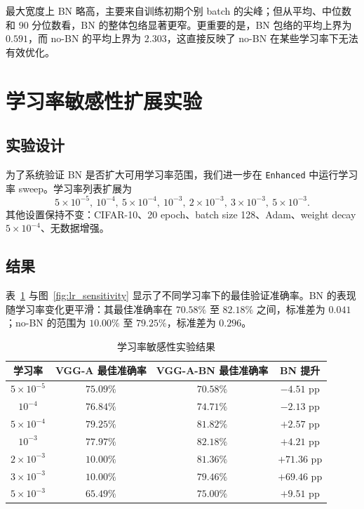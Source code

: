 \documentclass[UTF8,a4paper,11pt]{ctexart}
\begin{document}
最大宽度上 BN 略高，主要来自训练初期个别 batch 的尖峰；但从平均、中位数和 90 分位数看，BN 的整体包络显著更窄。更重要的是，BN 包络的平均上界为 $0.591$，而 no-BN 的平均上界为 $2.303$，这直接反映了 no-BN 在某些学习率下无法有效优化。

\section{学习率敏感性扩展实验}

\subsection{实验设计}

为了系统验证 BN 是否扩大可用学习率范围，我们进一步在 \texttt{Enhanced} 中运行学习率 sweep。学习率列表扩展为
\[
5\times10^{-5},\ 10^{-4},\ 5\times10^{-4},\ 10^{-3},\ 2\times10^{-3},\ 3\times10^{-3},\ 5\times10^{-3}.
\]
其他设置保持不变：CIFAR-10、20 epoch、batch size 128、Adam、weight decay $5\times10^{-4}$、无数据增强。

\subsection{结果}

表~\ref{tab:lr_sweep} 与图~\ref{fig:lr_sensitivity} 显示了不同学习率下的最佳验证准确率。BN 的表现随学习率变化更平滑：其最佳准确率在 $70.58\%$ 至 $82.18\%$ 之间，标准差为 $0.041$；no-BN 的范围为 $10.00\%$ 至 $79.25\%$，标准差为 $0.296$。

\begin{table}[H]
  \centering
  \caption{学习率敏感性实验结果}
  \label{tab:lr_sweep}
  \begin{tabular}{cccc}
    \toprule
    学习率 & VGG-A 最佳准确率 & VGG-A-BN 最佳准确率 & BN 提升 \\
    \midrule
    $5\times10^{-5}$ & $75.09\%$ & $70.58\%$ & $-4.51$ pp \\
    $10^{-4}$ & $76.84\%$ & $74.71\%$ & $-2.13$ pp \\
    $5\times10^{-4}$ & $79.25\%$ & $81.82\%$ & $+2.57$ pp \\
    $10^{-3}$ & $77.97\%$ & $\mathbf{82.18\%}$ & $+4.21$ pp \\
    $2\times10^{-3}$ & $10.00\%$ & $81.36\%$ & $+71.36$ pp \\
    $3\times10^{-3}$ & $10.00\%$ & $79.46\%$ & $+69.46$ pp \\
    $5\times10^{-3}$ & $65.49\%$ & $75.00\%$ & $+9.51$ pp \\
    \bottomrule
  \end{tabular}
\end{table}
\end{document}
